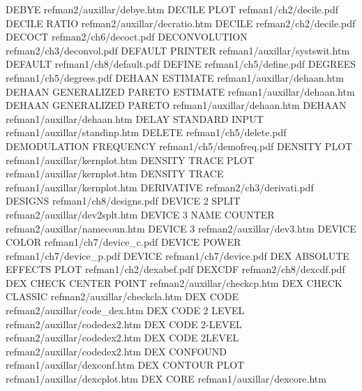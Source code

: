 DEBYE                                   refman2/auxillar/debye.htm
DECILE PLOT                             refman1/ch2/decile.pdf
DECILE RATIO                            refman2/auxillar/decratio.htm
DECILE                                  refman2/ch2/decile.pdf
DECOCT                                  refman2/ch6/decoct.pdf
DECONVOLUTION                           refman2/ch3/deconvol.pdf
DEFAULT PRINTER                         refman1/auxillar/systswit.htm
DEFAULT                                 refman1/ch8/default.pdf
DEFINE                                  refman1/ch5/define.pdf
DEGREES                                 refman1/ch5/degrees.pdf
DEHAAN ESTIMATE                         refman1/auxillar/dehaan.htm
DEHAAN GENERALIZED PARETO  ESTIMATE     refman1/auxillar/dehaan.htm
DEHAAN GENERALIZED PARETO               refman1/auxillar/dehaan.htm
DEHAAN                                  refman1/auxillar/dehaan.htm
DELAY STANDARD INPUT                    refman1/auxillar/standinp.htm
DELETE                                  refman1/ch5/delete.pdf
DEMODULATION FREQUENCY                  refman1/ch5/demofreq.pdf
DENSITY PLOT                            refman1/auxillar/kernplot.htm
DENSITY TRACE PLOT                      refman1/auxillar/kernplot.htm
DENSITY TRACE                           refman1/auxillar/kernplot.htm
DERIVATIVE                              refman2/ch3/derivati.pdf
DESIGNS                                 refman1/ch8/designs.pdf
DEVICE 2 SPLIT                          refman2/auxillar/dev2splt.htm
DEVICE 3 NAME COUNTER                   refman2/auxillar/namecoun.htm
DEVICE 3                                refman2/auxillar/dev3.htm
DEVICE COLOR                            refman1/ch7/device_c.pdf
DEVICE POWER                            refman1/ch7/device_p.pdf
DEVICE                                  refman1/ch7/device.pdf
DEX ABSOLUTE EFFECTS PLOT               refman1/ch2/dexabef.pdf
DEXCDF                                  refman2/ch8/dexcdf.pdf
DEX CHECK CENTER POINT                  refman2/auxillar/checkcp.htm
DEX CHECK CLASSIC                       refman2/auxillar/checkcla.htm
DEX CODE                                refman2/auxillar/code_dex.htm
DEX CODE 2 LEVEL                        refman2/auxillar/codedex2.htm
DEX CODE 2-LEVEL                        refman2/auxillar/codedex2.htm
DEX CODE 2LEVEL                         refman2/auxillar/codedex2.htm
DEX CONFOUND                            refman1/auxillar/dexconf.htm
DEX CONTOUR PLOT                        refman1/auxillar/dexcplot.htm
DEX CORE                                refman1/auxillar/dexcore.htm
